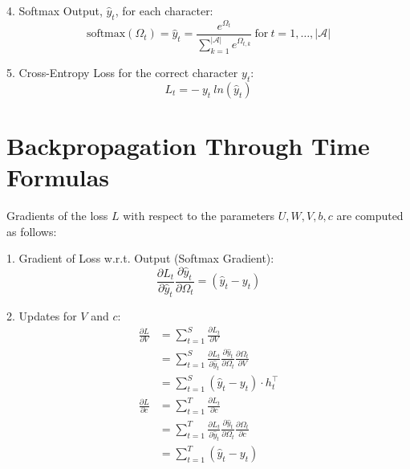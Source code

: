 \documentclass{article}
\begin{document}
4. Softmax Output, $\hat{y}_t$, for each character:
$$
\text{softmax} (\Omega_{t})=\hat{y}_{t}=\frac{e^{\Omega_t}}{\sum_{k=1}^{|\mathcal{A}|} e^{\Omega_{t,k}}} ~\text{for}~ t=1, \ldots, |\mathcal{A}|
$$

5. Cross-Entropy Loss for the correct character $y_{t}$:
$$
L_t = -~y_t~ln(\hat{y}_t)
$$
\section{Backpropagation Through Time Formulas}

Gradients of the loss $L$ with respect to the parameters $U, W, V, b, c$ are computed as follows:

1. Gradient of Loss w.r.t. Output (Softmax Gradient):
$$\label{eqn:partial_aV}
\frac{\partial L_t}{\partial \hat{y}_t}\frac{\partial \hat{y}_t}{\partial \Omega_t} = (\hat{y}_{t}-y_{t})
$$

2. Updates for $V$ and $c$:
\begin{align*} 
\frac{\partial L}{\partial V} &= \sum_{t=1}^{S} \frac{\partial L_{t}}{\partial V} \\
&= \sum_{t=1}^{S} \frac{\partial L_{t}}{\partial \hat{y}_{t}} \frac{\partial \hat{y}_{t}}{\partial \Omega_{t}} \frac{\partial \Omega_{t}}{\partial V}\\
&=\sum_{t=1}^{S} (\hat{y}_{t} - y_{t}) \cdot h_{t}^\top\\
\frac{\partial L}{\partial c} &= \sum_{t=1}^{T} \frac{\partial L_t}{\partial c} \\
&= \sum_{t=1}^{T} \frac{\partial L_{t}}{\partial \hat{y}_{t}} \frac{\partial \hat{y}_{t}}{\partial \Omega_{t}} \frac{\partial \Omega_{t}}{\partial c}\\
 &=\sum_{t=1}^{T} (\hat{y}_{t} - y_{t})
\end{align*}
\end{document}
